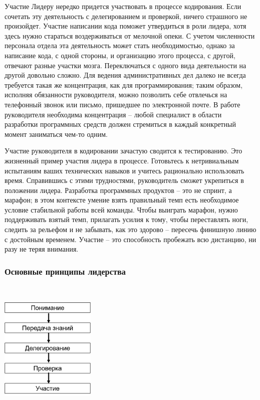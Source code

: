 \documentclass{../industrial-development}
\begin{document}
\lecturenotes Участие
 Лидеру нередко придется участвовать в процессе кодирования. Если сочетать эту деятельность с делегированием и проверкой, ничего страшного не произойдет. Участие написании кода поможет утвердиться в роли лидера, хотя здесь нужно стараться воздерживаться от мелочной опеки. С учетом численности персонала отдела эта деятельность может стать необходимостью, однако за написание кода, с одной стороны, и организацию этого процесса, с другой, отвечают разные участки мозга. Переключаться с одного вида деятельности на другой довольно сложно. Для ведения административных дел далеко не всегда требуется такая же концентрация, как для программирования; таким образом, исполняя обязанности руководителя, можно позволить себе отвлечься на телефонный звонок или письмо, пришедшее по электронной почте.
В работе руководителя необходима концентрация – любой специалист в области разработки программных средств должен стремиться в каждый конкретный момент заниматься чем-то одним.

Участие руководителя в кодировании зачастую сводится к тестированию. Это жизненный пример участия лидера в процессе. Готовьтесь к нетривиальным испытаниям ваших технических навыков и учитесь рационально использовать время. Справившись с этими трудностями, руководитель сможет укрепиться в положении лидера. Разработка программных продуктов – это не спринт, а марафон; в этом контексте умение взять правильный темп есть необходимое условие стабильной работы всей команды. Чтобы выиграть марафон, нужно поддерживать взятый темп, прилагать усилия к тому, чтобы переставлять ноги, следить за рельефом и не забывать, как это здорово – пересечь финишную линию с достойным временем.
Участие – это способность пробежать всю дистанцию, ни разу не теряя внимания.


\begin{frame} \frametitle{Основные принципы лидерства}
\begin{center}
  \includegraphics[width=129pt,height=190pt]{linear3.png}  
 \end{center}
\end{frame}
\end{document}
